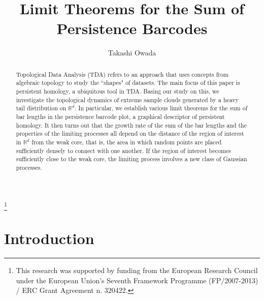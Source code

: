 \documentclass[11pt]{amsart}
\numberwithin{equation}{section}
\theoremstyle{plain}
\theoremstyle{definition}
\begin{document}


\title[Sum of persistence barcodes]
{Limit Theorems for the Sum of Persistence Barcodes}
\author{Takashi Owada}
\address{Faculty of Electrical Engineering\\
Technion-Israel Institute of Technology \\
Haifa, 32000, Israel}

\thanks{This research was supported by funding from the European Research Council under the European Union's
Seventh Framework Programme (FP/2007-2013) / ERC Grant Agreement n. 320422.}


\begin{abstract}
Topological Data Analysis (TDA) refers to an approach that uses concepts from algebraic topology to study the ``shapes" of datasets.
The main 
focus of this paper is persistent homology, 
a ubiquitous tool in TDA. 
Basing our study on this, we investigate the topological dynamics of extreme sample clouds generated by a heavy tail distribution on ${{\mathbb R}}^d$. In particular, we establish various limit theorems for the sum of bar lengths in the persistence barcode plot, a graphical descriptor of persistent homology. It then turns out that the growth rate of the sum of the bar lengths and the properties of the limiting processes all depend on the distance of the region of interest in ${{\mathbb R}}^d$ from the weak core, that is, the area in which random points are placed sufficiently densely to connect with one another. If the region of interest becomes sufficiently close to the weak core, the limiting process involves a new class of Gaussian processes.
\end{abstract}

\maketitle

\section{Introduction} \label{sec:intro}
\end{document}
